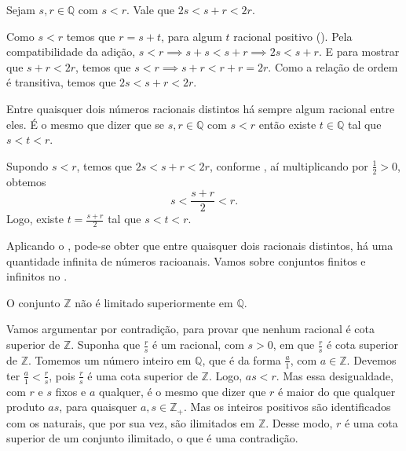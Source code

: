 \documentclass[../main.tex]{subfiles}
\begin{document}
\begin{prop}\label{rac-prop-somaEntreDobro}
    Sejam $s, r \in \mathbb{Q}$ com $s < r$. Vale que $2s < s+r < 2r$.
\end{prop}
\begin{dem}
    Como $s < r$ temos que $r = s + t$, para algum $t$ racional positivo ().
    Pela compatibilidade da adição, $s< r \implies s+s < s+r \implies 2s < s+r$.
    E para mostrar que $s+r < 2r$, temos que $s < r \implies s+r < r+r = 2r$. Como a relação de ordem é transitiva, temos que $2s < s+r < 2r$.
\end{dem}

\begin{corol}\label{rac-corol-terceiroEntreDois}
    Entre quaisquer dois números racionais distintos há sempre algum racional entre eles. É o mesmo que dizer
    que se $s,r \in \mathbb{Q}$ com $s<r$ então existe $t \in \mathbb{Q}$ tal que  $s < t < r$.
\end{corol}
\begin{dem}
    Supondo $s < r$, temos que $2s < s+r < 2r$, conforme , aí multiplicando por $\frac{1}{2} > 0$, obtemos 
    \[ s < \frac{s+r}{2} < r. \]
    Logo, existe $t = \frac{s+r}{2}$ tal que $s < t < r$.
\end{dem}
\begin{obs}
    Aplicando o , pode-se obter que entre quaisquer dois racionais distintos, há uma quantidade infinita de números racioanais. Vamos sobre conjuntos finitos e infinitos no .
\end{obs}

\begin{teo}\label{rac-teo-ilimitadoSuperiormente}
    O conjunto $\mathbb{Z}$ não é limitado superiormente em $\mathbb{Q}$.
\end{teo}
\begin{dem}
    Vamos argumentar por contradição, para provar que nenhum racional é cota superior de $\mathbb{Z}$.
    Suponha que $\frac{r}{s}$ é um racional, com $s>0$, em que $\frac{r}{s}$ é cota superior de $\mathbb{Z}$. Tomemos um número inteiro em $\mathbb{Q}$, que é da forma $\frac{a}{1}$, com $a \in \mathbb{Z}$. Devemos ter $\frac{a}{1} < \frac{r}{s}$, pois $\frac{r}{s}$ é uma cota superior de $\mathbb{Z}$. Logo, $as < r$. Mas essa desigualdade, com $r$ e $s$ fixos e $a$ qualquer, é o mesmo que dizer que $r$ é maior do que qualquer produto $as$, para quaisquer $a,s \in \mathbb{Z}_{+}$. Mas os inteiros positivos são identificados com os naturais, que por sua vez, são ilimitados em $\mathbb{Z}$. Desse modo, $r$ é uma cota superior de um conjunto ilimitado, o que é uma contradição.
\end{dem}
\end{document}
